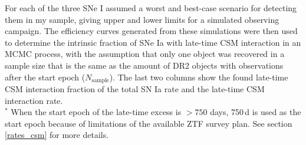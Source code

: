 \documentclass[a4paper,oneside,12pt, class=Latex/Classes/PhDthesisPSnPDF, crop=false]{standalone}
\begin{document}
\begin{table}
 \centering
 \caption{Parameters used for rate estimation simulations for each object.}
\begin{flushleft}
For each of the three SNe I assumed a worst and best-case scenario for detecting them in my sample, giving upper and lower limits for a simulated observing campaign. The efficiency curves generated from these simulations were then used to determine the intrinsic fraction of SNe Ia with late-time CSM interaction in an MCMC process, with the assumption that only one object was recovered in a sample size that is the same as the amount of DR2 objects with observations after the start epoch ($N_\text{sample}$). The last two columns show the found late-time CSM interaction fraction of the total SN Ia rate and the late-time CSM interaction rate.\\
$^{*}$ When the start epoch of the late-time excess is $>750$ days, 750\,d is used as the start epoch because of limitations of the available ZTF survey plan. See section \ref{rates_csm} for more details.\\
\end{flushleft} 
 \label{rate_sims}
\end{table}
\end{document}
